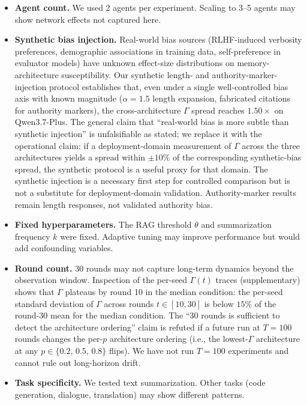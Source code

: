 \documentclass[11pt]{article}
\begin{document}
\begin{itemize}[nosep]
    \item \textbf{Agent count.} We used 2 agents per experiment. Scaling to 3--5 agents may show network effects not captured here.
    \item \textbf{Synthetic bias injection.} Real-world bias sources (RLHF-induced verbosity preferences, demographic associations in training data, self-preference in evaluator models) have unknown effect-size distributions on memory-architecture susceptibility. Our synthetic length- and authority-marker-injection protocol establishes that, even under a single well-controlled bias axis with known magnitude ($\alpha = 1.5$ length expansion, fabricated citations for authority markers), the cross-architecture $\Gamma$ spread reaches $1.50\times$ on Qwen3.7-Plus. The general claim that ``real-world bias is more subtle than synthetic injection'' is unfalsifiable as stated; we replace it with the operational claim: if a deployment-domain measurement of $\Gamma$ across the three architectures yields a spread within $\pm 10\%$ of the corresponding synthetic-bias spread, the synthetic protocol is a useful proxy for that domain. The synthetic injection is a necessary first step for controlled comparison but is not a substitute for deployment-domain validation. Authority-marker results remain length responses, not validated authority bias.
    \item \textbf{Fixed hyperparameters.} The RAG threshold $\theta$ and summarization frequency $k$ were fixed. Adaptive tuning may improve performance but would add confounding variables.
    \item \textbf{Round count.} 30 rounds may not capture long-term dynamics beyond the observation window. Inspection of the per-seed $\Gamma(t)$ traces (supplementary) shows that $\Gamma$ plateaus by round 10 in the median condition: the per-seed standard deviation of $\Gamma$ across rounds $t \in [10, 30]$ is below $15\%$ of the round-30 mean for the median condition. The ``30 rounds is sufficient to detect the architecture ordering'' claim is refuted if a future run at $T = 100$ rounds changes the per-$p$ architecture ordering (i.e., the lowest-$\Gamma$ architecture at any $p \in \{0.2,\,0.5,\,0.8\}$ flips). We have not run $T = 100$ experiments and cannot rule out long-horizon drift.
    \item \textbf{Task specificity.} We tested text summarization. Other tasks (code generation, dialogue, translation) may show different patterns.
\end{itemize}
\end{document}
